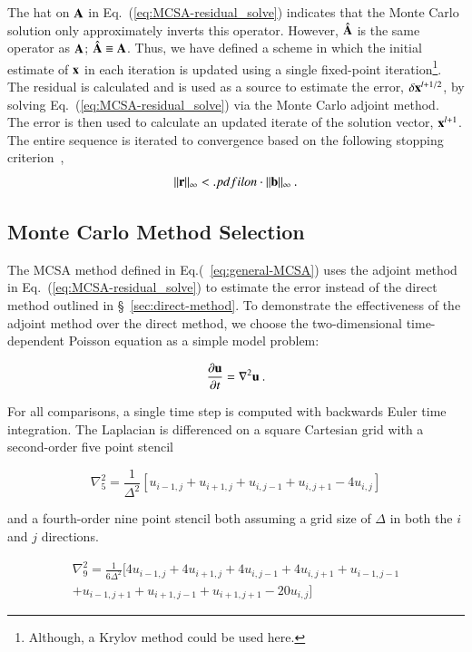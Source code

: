 \documentclass[preprint,12pt]{elsarticle}
\newcommand{\vA}{\ensuremath{\ve{A}}}
\newcommand{\vb}{\ensuremath{\ve{b}}}
\newcommand{\vx}{\ensuremath{\ve{x}}}
\newcommand{\vr}{\ensuremath{\ve{r}}}
\newcommand{\vu}{\ensuremath{\ve{u}}}
\begin{document}
The hat on $\vA$ in Eq.~(\ref{eq:MCSA-residual_solve}) indicates that
the Monte Carlo solution only approximately inverts this operator.
However, $\hat{\vA}$ is the same operator as $\vA$;
$\hat{\vA}\equiv\vA$.  Thus, we have defined a scheme in which the
initial estimate of $\vx$ in each iteration is updated using a single
fixed-point iteration\footnote{Although, a Krylov method could be used
  here.}.  The residual is calculated and is used as a source to
estimate the error, $\delta\vx^{l+1/2}$, by solving
Eq.~(\ref{eq:MCSA-residual_solve}) via the Monte Carlo adjoint
method. The error is then used to calculate an updated iterate of the
solution vector, $\vx^{l+1}$.  The entire sequence is iterated to
convergence based on the following stopping
criterion~\cite{kelley_1995},
\begin{equation}
  \|\vr\|_{\infty} < .pdfilon\cdot\|\vb\|_\infty\:.
  \label{eq:stopping-criteria}
\end{equation}

\subsection{Monte Carlo Method Selection}

The MCSA method defined in Eq.(~\ref{eq:general-MCSA}) uses the
adjoint method in Eq.~(\ref{eq:MCSA-residual_solve}) to estimate the
error instead of the direct method outlined in
\S~\ref{sec:direct-method}. To demonstrate the effectiveness of the
adjoint method over the direct method, we choose the two-dimensional
time-dependent Poisson equation as a simple model problem:

\begin{equation}
  \frac{\partial \vu}{\partial t} = \nabla^2 \vu\:.
  \label{eq:poisson_equation}
\end{equation}

For all comparisons, a single time step is computed with backwards
Euler time integration. The Laplacian is differenced on a square
Cartesian grid with a second-order five point stencil

\begin{equation}
  \nabla^2_5 = \frac{1}{\Delta^2}[u_{i-1,j} + u_{i+1,j} + u_{i,j-1} +
    u_{i,j+1} - 4 u_{i,j}]
  \label{eq:five_point_stencil}
\end{equation}

and a fourth-order nine point stencil both assuming a grid size of
$\Delta$ in both the $i$ and $j$ directions.

\begin{multline}
  \nabla^2_9 = \frac{1}{6\Delta^2}[4 u_{i-1,j} + 4 u_{i+1,j} + 4
    u_{i,j-1} + 4 u_{i,j+1} + u_{i-1,j-1}\\
    + u_{i-1,j+1} + u_{i+1,j-1} + u_{i+1,j+1} - 20 u_{i,j}]
  \label{eq:nine_point_stencil}
\end{multline}
\end{document}
